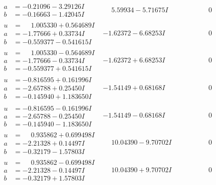 \documentclass[1p]{elsarticle_modified}
\theoremstyle{definition}
\begin{document}
$$\begin{array}{c|c|c}
\begin{aligned}
a &= -0.21096 - 3.29126 I \\
b &= -0.16663 - 1.42045 I\end{aligned}
 & \phantom{-}5.59934 - 5.71675 I & \phantom{-0.000000 } 0 \\ \hline\begin{aligned}
u &= \phantom{-}1.005330 + 0.564689 I \\
a &= -1.77666 + 0.33734 I \\
b &= -0.559377 - 0.541615 I\end{aligned}
 & -1.62372 - 6.68253 I & \phantom{-0.000000 } 0 \\ \hline\begin{aligned}
u &= \phantom{-}1.005330 - 0.564689 I \\
a &= -1.77666 - 0.33734 I \\
b &= -0.559377 + 0.541615 I\end{aligned}
 & -1.62372 + 6.68253 I & \phantom{-0.000000 } 0 \\ \hline\begin{aligned}
u &= -0.816595 + 0.161996 I \\
a &= -2.65788 + 0.25450 I \\
b &= -0.145940 + 1.183650 I\end{aligned}
 & -1.54149 + 0.68168 I & \phantom{-0.000000 } 0 \\ \hline\begin{aligned}
u &= -0.816595 - 0.161996 I \\
a &= -2.65788 - 0.25450 I \\
b &= -0.145940 - 1.183650 I\end{aligned}
 & -1.54149 - 0.68168 I & \phantom{-0.000000 } 0 \\ \hline\begin{aligned}
u &= \phantom{-}0.935862 + 0.699498 I \\
a &= -2.21328 + 0.14497 I \\
b &= -0.32179 - 1.57803 I\end{aligned}
 & \phantom{-}10.04390 - 9.70702 I & \phantom{-0.000000 } 0 \\ \hline\begin{aligned}
u &= \phantom{-}0.935862 - 0.699498 I \\
a &= -2.21328 - 0.14497 I \\
b &= -0.32179 + 1.57803 I\end{aligned}
 & \phantom{-}10.04390 + 9.70702 I & \phantom{-0.000000 } 0 \\ \hline\begin{aligned}

\end{aligned}
\end{array}$$
\end{document}
